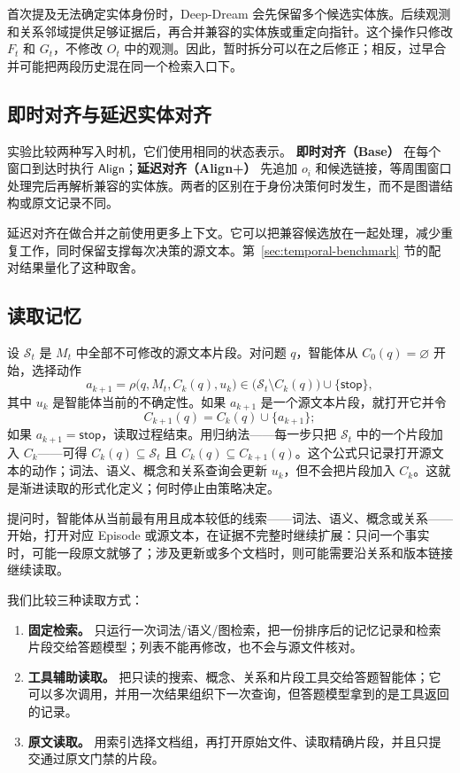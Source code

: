 首次提及无法确定实体身份时，Deep-Dream 会先保留多个候选实体族。后续观测和关系邻域提供足够证据后，再合并兼容的实体族或重定向指针。这个操作只修改 $F_t$ 和 $G_t$，不修改 $O_t$ 中的观测。因此，暂时拆分可以在之后修正；相反，过早合并可能把两段历史混在同一个检索入口下。

\subsection{即时对齐与延迟实体对齐}

实验比较两种写入时机，它们使用相同的状态表示。 \textbf{即时对齐（Base）} 在每个窗口到达时执行 $\mathsf{Align}$；\textbf{延迟对齐（Align+）} 先追加 $o_i$ 和候选链接，等周围窗口处理完后再解析兼容的实体族。两者的区别在于身份决策何时发生，而不是图谱结构或原文记录不同。

延迟对齐在做合并之前使用更多上下文。它可以把兼容候选放在一起处理，减少重复工作，同时保留支撑每次决策的源文本。第~\cref{sec:temporal-benchmark} 节的配对结果量化了这种取舍。

\subsection{读取记忆}
\label{sec:answer-paths}

设 $\mathcal S_t$ 是 $M_t$ 中全部不可修改的源文本片段。对问题 $q$，智能体从 $C_0(q)=\varnothing$ 开始，选择动作
\[
a_{k+1}=\rho\bigl(q,M_t,C_k(q),u_k\bigr)
\in\bigl(\mathcal S_t\setminus C_k(q)\bigr)\cup\{\mathsf{stop}\},
\]
其中 $u_k$ 是智能体当前的不确定性。如果 $a_{k+1}$ 是一个源文本片段，就打开它并令
\[
C_{k+1}(q)=C_k(q)\cup\{a_{k+1}\};
\]
如果 $a_{k+1}=\mathsf{stop}$，读取过程结束。用归纳法——每一步只把 $\mathcal S_t$ 中的一个片段加入 $C_k$——可得 $C_k(q)\subseteq\mathcal S_t$ 且 $C_k(q)\subseteq C_{k+1}(q)$。这个公式只记录打开源文本的动作；词法、语义、概念和关系查询会更新 $u_k$，但不会把片段加入 $C_k$。这就是渐进读取的形式化定义；何时停止由策略决定。

提问时，智能体从当前最有用且成本较低的线索——词法、语义、概念或关系——开始，打开对应 Episode 或源文本，在证据不完整时继续扩展：只问一个事实时，可能一段原文就够了；涉及更新或多个文档时，则可能需要沿关系和版本链接继续读取。

我们比较三种读取方式：
\begin{enumerate}
    \item \textbf{固定检索。} 只运行一次词法/语义/图检索，把一份排序后的记忆记录和检索片段交给答题模型；列表不能再修改，也不会与源文件核对。
    \item \textbf{工具辅助读取。} 把只读的搜索、概念、关系和片段工具交给答题智能体；它可以多次调用，并用一次结果组织下一次查询，但答题模型拿到的是工具返回的记录。
    \item \textbf{原文读取。} 用索引选择文档组，再打开原始文件、读取精确片段，并且只提交通过原文门禁的片段。
\end{enumerate}

